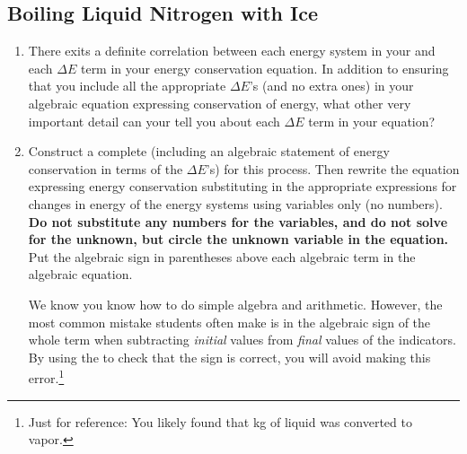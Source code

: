 \label{act1.2.4}


\subsection{Boiling Liquid Nitrogen with Ice}  

\begin{fnt}
	
\end{fnt}


\begin{enumerate}
	\item There exits a definite correlation between each energy system in your \EnergyDiagram{} and each $\Delta E$ term in your energy conservation equation. In addition to ensuring that you include all the appropriate $\Delta E$'s (and no extra ones) in your algebraic equation expressing conservation of energy, what other very important detail can your \EnergyDiagram{} tell you about each $\Delta E$ term in your equation?
	
	\item Construct a complete \EnergyDiagram{} (including an algebraic statement of energy conservation in terms of the $\Delta E$'s) for this process. Then rewrite the equation expressing energy conservation substituting in the appropriate expressions for changes in energy of the energy systems using variables only (no numbers). \textbf{Do not substitute any numbers for the variables, and do not solve for the unknown, but circle the unknown variable in the equation.} Put the algebraic sign in parentheses above each algebraic term in the algebraic equation.

	We know you know how to do simple algebra and arithmetic. However, the most common mistake students often make is in the algebraic sign of the whole term when subtracting \emph{initial} values from \emph{final} values of the indicators. By using the \EnergyDiagram{} to check that the sign is correct, you will avoid making this error.\footnote{Just for reference: You likely found that \about\unit[4]{kg} of liquid  was converted to vapor.}

\end{enumerate}


